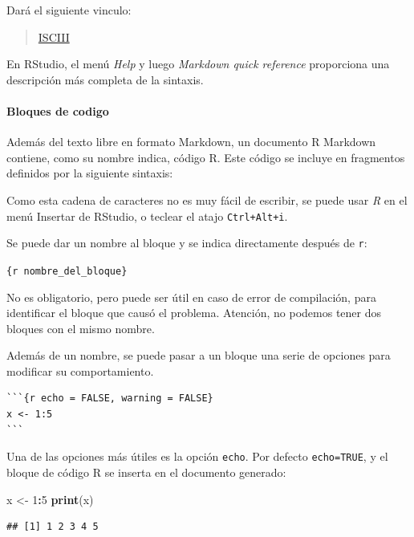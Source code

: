 \documentclass[]{article}
\newenvironment{Shaded}{\begin{snugshade}}{\end{snugshade}}
\newcommand{\DecValTok}[1]{\textcolor[rgb]{0.00,0.00,0.81}{#1}}
\newcommand{\KeywordTok}[1]{\textcolor[rgb]{0.13,0.29,0.53}{\textbf{#1}}}
\newcommand{\NormalTok}[1]{#1}
\newcommand{\OperatorTok}[1]{\textcolor[rgb]{0.81,0.36,0.00}{\textbf{#1}}}
\newcommand{\StringTok}[1]{\textcolor[rgb]{0.31,0.60,0.02}{#1}}
\let\oldparagraph\paragraph
\renewcommand{\paragraph}[1]{\oldparagraph{#1}\mbox{}}
\numberwithin{ejcnt}{section}
\begin{document}
Dará el siguiente vinculo:

\begin{quote}
\href{http://www.isciii.es/}{ISCIII}
\end{quote}

En RStudio, el menú \emph{Help} y luego \emph{Markdown quick reference} proporciona una descripción más completa de la sintaxis.

\hypertarget{bloques-de-codigo}{%
\paragraph{Bloques de codigo}\label{bloques-de-codigo}}

Además del texto libre en formato Markdown, un documento R Markdown contiene, como su nombre indica, código R. Este código se incluye en fragmentos definidos por la siguiente sintaxis:

Como esta cadena de caracteres no es muy fácil de escribir, se puede usar \emph{R} en el menú Insertar de RStudio, o teclear el atajo \texttt{Ctrl+Alt+i}.

Se puede dar un nombre al bloque y se indica directamente después de \texttt{r}:

\texttt{\{r\ nombre\_del\_bloque\}}

No es obligatorio, pero puede ser útil en caso de error de compilación, para identificar el bloque que causó el problema. Atención, no podemos tener dos bloques con el mismo nombre.

Además de un nombre, se puede pasar a un bloque una serie de opciones para modificar su comportamiento.

\begin{verbatim}
```{r echo = FALSE, warning = FALSE}
x <- 1:5
```
\end{verbatim}

Una de las opciones más útiles es la opción \texttt{echo}. Por defecto \texttt{echo=TRUE}, y el bloque de código R se inserta en el documento generado:

\begin{Shaded}
\begin{Highlighting}[]
\NormalTok{x <-}\StringTok{ }\DecValTok{1}\OperatorTok{:}\DecValTok{5}
\KeywordTok{print}\NormalTok{(x)}
\end{Highlighting}
\end{Shaded}

\begin{verbatim}
## [1] 1 2 3 4 5
\end{verbatim}
\end{document}
